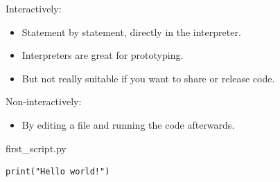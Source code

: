 \documentclass[aspectratio=1610,slidestop]{beamer}
\begin{document}
\begin{pframe}
\vspace{-0.5cm}
\begin{minipage}[t]{0.47\textwidth}
  Interactively:
  {\small
  \begin{itemize}
    \item Statement by statement, directly in the interpreter.
  \end{itemize}}
  \pause
  \begin{terminal}
  {\tiny \color{white}{
   \begin{lstlisting}[frame=,style=,numbers=none,aboveskip=-0.1cm,belowskip=-0.1cm]
$ python
Python 3.7 (default, Nov 26 2019, 10:23:46)
[GCC 5.4.0 20160609] on linux
Type "help", "copyright", "credits" or
"license" for more information.
>>> print('Hello world')
Hello world
>>>
  \end{lstlisting}}}
 \end{terminal}
 \pause
 {\small
 \begin{itemize}
  \item Interpreters are great for prototyping.
  \item But not really suitable if you want to share or release code.
 \end{itemize}}
 \end{minipage}\qquad%
 \begin{minipage}[t]{0.47\textwidth}
  \pause
  \vspace{-0.3cm}
  Non-interactively:
  {\small
  \begin{itemize}
   \item By editing a file and running the code afterwards.
  \end{itemize}}
  \pause
  \begin{pythonfile}{first\_script.py}
   \begin{verbatim}
print("Hello world!")
   \end{verbatim}
  \end{pythonfile}
  \pause
  \begin{terminal}
   {\tiny \color{white}{
   \begin{lstlisting}[frame=,style=,numbers=none,aboveskip=-0.1cm,belowskip=-0.1cm]
$ python first_script.py
Hello world
$
   \end{lstlisting}}}
  \end{terminal}
 \end{minipage}
\end{pframe}
\end{document}
